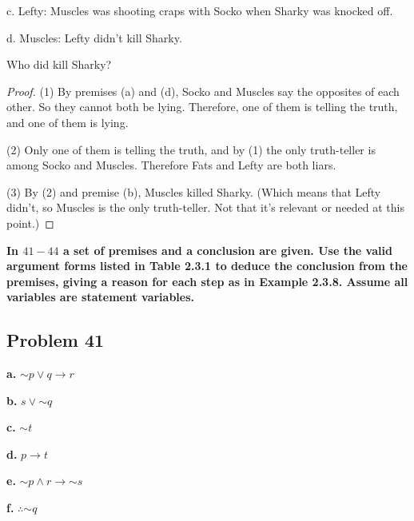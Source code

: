 \documentclass[14pt]{extarticle}
\begin{document}
c. Lefty: Muscles was shooting craps with Socko when Sharky was knocked off.

d. Muscles: Lefty didn’t kill Sharky.

Who did kill Sharky?

\begin{proof}
(1) By premises (a) and (d), Socko and Muscles say the opposites of each other.
So they cannot both be lying. Therefore, one of them is telling the truth, and
one of them is lying.

(2) Only one of them is telling the truth, and by (1) the only truth-teller is
among Socko and Muscles. Therefore Fats and Lefty are both liars.

(3) By (2) and premise (b), Muscles killed Sharky. (Which means that Lefty
didn't, so Muscles is the only truth-teller. Not that it's relevant or needed at
this point.)
\end{proof}

{\bf \color{cyan} In $41-44$ a set of premises and a conclusion are given. Use
the valid argument forms listed in Table 2.3.1 to deduce the conclusion from the
premises, giving a reason for each step as in Example 2.3.8. Assume all
variables are statement variables.}

\subsection{Problem 41}
{\bf a.} ${\sim p} \vee q \to r$

{\bf b.} $s \vee {\sim q}$

{\bf c.} ${\sim t}$

{\bf d.} $p \to t$

{\bf e.} ${\sim p} \wedge r \to {\sim s}$

{\bf f.} $\therefore {\sim q}$
\end{document}
